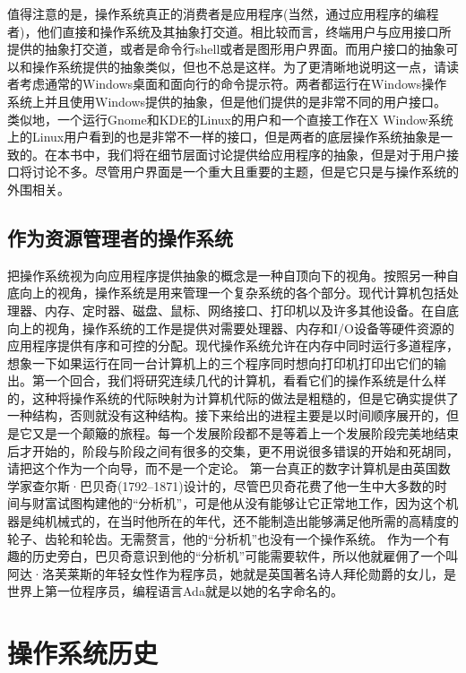 	值得注意的是，操作系统真正的消费者是应用程序(当然，通过应用程序的编程者)，他们直接和操作系统及其抽象打交道。相比较而言，终端用户与应用接口所提供的抽象打交道，或者是命令行shell或者是图形用户界面。而用户接口的抽象可以和操作系统提供的抽象类似，但也不总是这样。为了更清晰地说明这一点，请读者考虑通常的Windows桌面和面向行的命令提示符。两者都运行在Windows操作系统上并且使用Windows提供的抽象，但是他们提供的是非常不同的用户接口。类似地，一个运行Gnome和KDE的Linux的用户和一个直接工作在X Window系统上的Linux用户看到的也是非常不一样的接口，但是两者的底层操作系统抽象是一致的。在本书中，我们将在细节层面讨论提供给应用程序的抽象，但是对于用户接口将讨论不多。尽管用户界面是一个重大且重要的主题，但是它只是与操作系统的外围相关。

\subsection{作为资源管理者的操作系统}

	把操作系统视为向应用程序提供抽象的概念是一种自顶向下的视角。按照另一种自底向上的视角，操作系统是用来管理一个复杂系统的各个部分。现代计算机包括处理器、内存、定时器、磁盘、鼠标、网络接口、打印机以及许多其他设备。在自底向上的视角，操作系统的工作是提供对需要处理器、内存和I/O设备等硬件资源的应用程序提供有序和可控的分配。现代操作系统允许在内存中同时运行多道程序，想象一下如果运行在同一台计算机上的三个程序同时想向打印机打印出它们的输出。第一个回合，我们将研究连续几代的计算机，看看它们的操作系统是什么样的，这种将操作系统的代际映射为计算机代际的做法是粗糙的，但是它确实提供了一种结构，否则就没有这种结构。接下来给出的进程主要是以时间顺序展开的，但是它又是一个颠簸的旅程。每一个发展阶段都不是等着上一个发展阶段完美地结束后才开始的，阶段与阶段之间有很多的交集，更不用说很多错误的开始和死胡同，请把这个作为一个向导，而不是一个定论。
	第一台真正的数字计算机是由英国数学家查尔斯·巴贝奇(1792–1871)设计的，尽管巴贝奇花费了他一生中大多数的时间与财富试图构建他的“分析机”，可是他从没有能够让它正常地工作，因为这个机器是纯机械式的，在当时他所在的年代，还不能制造出能够满足他所需的高精度的轮子、齿轮和轮齿。无需赘言，他的“分析机”也没有一个操作系统。
	作为一个有趣的历史旁白，巴贝奇意识到他的“分析机”可能需要软件，所以他就雇佣了一个叫阿达·洛芙莱斯的年轻女性作为程序员，她就是英国著名诗人拜伦勋爵的女儿，是世界上第一位程序员，编程语言Ada就是以她的名字命名的。
	
\section{操作系统历史}

